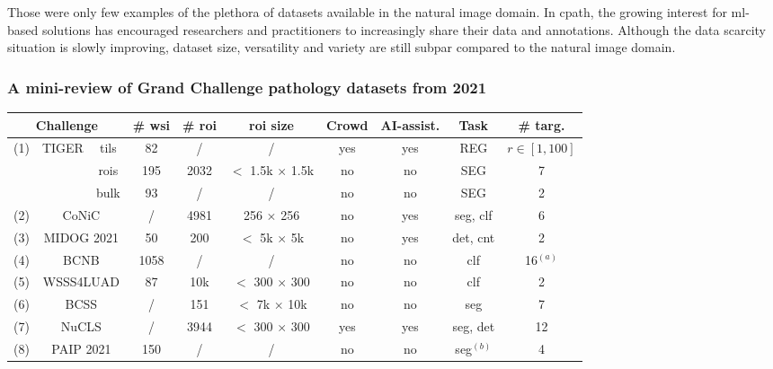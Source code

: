 Those were only few examples of the plethora of datasets available in the natural image domain. In \acrlong{cpath}, the growing interest for \acrshort{ml}-based solutions has encouraged researchers and practitioners to increasingly share their data and annotations. Although the data scarcity situation is slowly improving, dataset size, versatility and variety are still subpar compared to the natural image domain.

\subsubsection{A mini-review of Grand Challenge pathology datasets from 2021}
\label{sssec:backdp:grandchallenge}

\begin{table}
  \centering
  \footnotesize
  \begin{tabular}{|ccc|ccccccc|}
    \hline
    \multicolumn{3}{|c|}{Challenge} & \# \acrshort{wsi} & \# \acrshort{roi} & \acrshort{roi} size & Crowd & AI-assist. & Task & \# targ. \\
    \hline
    \multirow{3}{*}{(1)} & \multirow{3}{*}{TIGER} & tils & 82 & / &  / & yes & yes & REG & $r \in \left[1, 100\right]$\\
    & & rois & 195 & 2032 & $<$ 1.5k $\times$ 1.5k & no & no & SEG & 7\\
    & & bulk & 93 & / & / & no & no & SEG & 2 \\
    \hdashline
    (2) & \multicolumn{2}{c|}{CoNiC} & / & 4981 & 256 $\times$ 256 & no & yes & \acrshort{seg}, \acrshort{clf} & 6 \\
    (3) & \multicolumn{2}{c|}{MIDOG 2021} & 50 & 200 & $<$ 5k $\times$ 5k & no & yes & \acrshort{det}, \acrshort{cnt} & 2 \\
    (4) & \multicolumn{2}{c|}{BCNB} & 1058 & / & / & no & no & \acrshort{clf} & 16$^{(a)}$ \\
    (5) & \multicolumn{2}{c|}{WSSS4LUAD} & 87 & 10k & $<$ 300 $\times$ 300 & no & no & \acrshort{clf} & 2\\
    (6) & \multicolumn{2}{c|}{BCSS} & / & 151 & $<$ 7k $\times$ 10k & no & no & \acrshort{seg} & 7\\
    (7) & \multicolumn{2}{c|}{NuCLS} & / & 3944 & $<$ 300 $\times$ 300 & yes & yes & \acrshort{seg}, \acrshort{det} & 12 \\
    (8) & \multicolumn{2}{c|}{PAIP 2021} & 150 & / & / & no & no & \acrshort{seg}$^{(b)}$ & 4 \\
    \hline
  \end{tabular}

\end{table}

